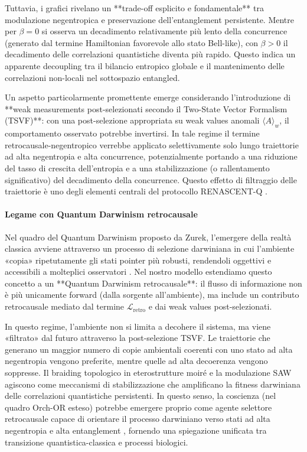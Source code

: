 \documentclass[11pt,a4paper]{article}
\let\oldcite\cite
\renewcommand{\cite}{\protect\oldcite}
\theoremstyle{plain}
\theoremstyle{definition}
\begin{document}
Tuttavia, i grafici rivelano un **trade-off esplicito e fondamentale** tra modulazione negentropica e preservazione dell'entanglement persistente. Mentre per $\beta = 0$ si osserva un decadimento relativamente più lento della concurrence (generato dal termine Hamiltonian favorevole allo stato Bell-like), con $\beta > 0$ il decadimento delle correlazioni quantistiche diventa più rapido. Questo indica un apparente decoupling tra il bilancio entropico globale e il mantenimento delle correlazioni non-locali nel sottospazio entangled.

Un aspetto particolarmente promettente emerge considerando l'introduzione di **weak measurements post-selezionati secondo il Two-State Vector Formalism (TSVF)**: con una post-selezione appropriata su weak values anomali $\langle A \rangle_w$, il comportamento osservato potrebbe invertirsi. In tale regime il termine retrocausale-negentropico verrebbe applicato selettivamente solo lungo traiettorie ad alta negentropia e alta concurrence, potenzialmente portando a una riduzione del tasso di crescita dell'entropia e a una stabilizzazione (o rallentamento significativo) del decadimento della concurrence. Questo effetto di filtraggio delle traiettorie è uno degli elementi centrali del protocollo RENASCENT-Q \cite{Aharonov2008}.

\paragraph{Legame con Quantum Darwinism retrocausale}

Nel quadro del Quantum Darwinism proposto da Zurek, l'emergere della realtà classica avviene attraverso un processo di selezione darwiniana in cui l'ambiente «copia» ripetutamente gli stati pointer più robusti, rendendoli oggettivi e accessibili a molteplici osservatori \cite{Zurek2009}. Nel nostro modello estendiamo questo concetto a un **Quantum Darwinism retrocausale**: il flusso di informazione non è più unicamente forward (dalla sorgente all'ambiente), ma include un contributo retrocausale mediato dal termine \(\mathcal{L}_{\text{retro}}\) e dai weak values post-selezionati.

In questo regime, l'ambiente non si limita a decohere il sistema, ma viene «filtrato» dal futuro attraverso la post-selezione TSVF. Le traiettorie che generano un maggior numero di copie ambientali coerenti con uno stato ad alta negentropia vengono preferite, mentre quelle ad alta decoerenza vengono soppresse. Il braiding topologico in eterostrutture moiré e la modulazione SAW agiscono come meccanismi di stabilizzazione che amplificano la fitness darwiniana delle correlazioni quantistiche persistenti. In questo senso, la coscienza (nel quadro Orch-OR esteso) potrebbe emergere proprio come agente selettore retrocausale capace di orientare il processo darwiniano verso stati ad alta negentropia e alta entanglement \cite{Penrose1996, Hameroff2014}, fornendo una spiegazione unificata tra transizione quantistica-classica e processi biologici.
\end{document}
